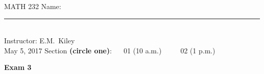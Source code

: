 \documentclass[letterpaper,12pt]{article}
\newcounter{TotalProbs}
\newcounter{TotalSheets}
\begin{document}
\noindent MATH 232 \hfill Name: \rule{20em}{0.5pt}\\
\noindent Instructor: E.M.\ Kiley\\
\noindent May 5, 2017 \hfill  Section \textbf{(circle one)}: $\quad$ 01 (10 a.m.) $\qquad$ 02 (1 p.m.)\\
\begin{center}\textbf{Exam 3}\end{center}

\vspace*{\fill}
\vspace*{\fill}

\pagebreak


\vspace*{\fill}


\ifodd{}
\else
\fi
\end{document}
